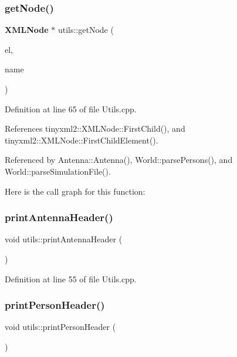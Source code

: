 \subsubsection{get\+Node()}
{\footnotesize\ttfamily \textbf{ X\+M\+L\+Node} $\ast$ utils\+::get\+Node (\begin{DoxyParamCaption}\item[{\textbf{ X\+M\+L\+Element} $\ast$}]{el,  }\item[{const char $\ast$}]{name }\end{DoxyParamCaption})}



Definition at line 65 of file Utils.\+cpp.



References tinyxml2\+::\+X\+M\+L\+Node\+::\+First\+Child(), and tinyxml2\+::\+X\+M\+L\+Node\+::\+First\+Child\+Element().



Referenced by Antenna\+::\+Antenna(), World\+::parse\+Persons(), and World\+::parse\+Simulation\+File().

Here is the call graph for this function\+:
\mbox{\label{namespaceutils_a2080e7db5afc5bb1b4c9ef5336f78ccb}} 
\subsubsection{print\+Antenna\+Header()}
{\footnotesize\ttfamily void utils\+::print\+Antenna\+Header (\begin{DoxyParamCaption}{ }\end{DoxyParamCaption})}



Definition at line 55 of file Utils.\+cpp.

\mbox{\label{namespaceutils_a1978a6ccb2360773215aba027d8b6f08}} 
\subsubsection{print\+Person\+Header()}
{\footnotesize\ttfamily void utils\+::print\+Person\+Header (\begin{DoxyParamCaption}{ }\end{DoxyParamCaption})}



